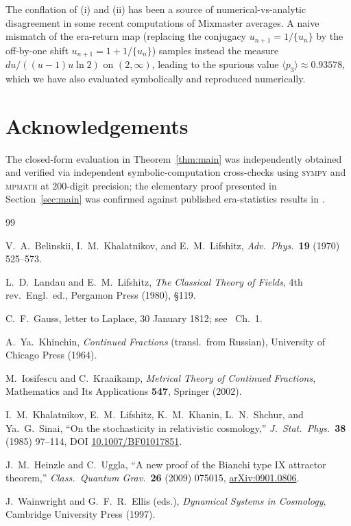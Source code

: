\documentclass[11pt,a4paper]{article}
\begin{document}
\medskip
The conflation of (i) and (ii) has been a source of numerical-vs-analytic
disagreement in some recent computations of Mixmaster averages.
A naive mismatch of the era-return map (replacing the conjugacy
$u_{n+1}=1/\{u_n\}$ by the off-by-one shift $u_{n+1}=1+1/\{u_n\}$)
samples instead the measure $du/((u-1)u\ln 2)$ on $(2,\infty)$, leading to
the spurious value $\langle p_3\rangle\approx 0.93578$, which we have
also evaluated symbolically and reproduced numerically.

\section*{Acknowledgements}

The closed-form evaluation in Theorem~\ref{thm:main} was independently
obtained and verified via independent symbolic-computation cross-checks using \textsc{sympy} and
\textsc{mpmath} at $200$-digit precision; the elementary proof presented in
Section~\ref{sec:main} was confirmed against published era-statistics
results in \cite{KLKSS1985}.

\begin{thebibliography}{99}

V.~A.~Belinskii, I.~M.~Khalatnikov, and E.~M.~Lifshitz,
\emph{Adv.\ Phys.}\ \textbf{19} (1970) 525--573.

L.~D.~Landau and E.~M.~Lifshitz,
\emph{The Classical Theory of Fields}, 4th rev.\ Engl.\ ed.,
Pergamon Press (1980), \S119.

C.~F.~Gauss, letter to Laplace, 30 January 1812; see
\cite{Iosifescu2002}~Ch.~1.

A.~Ya.~Khinchin, \emph{Continued Fractions} (transl.\ from Russian),
University of Chicago Press (1964).

M.~Iosifescu and C.~Kraaikamp, \emph{Metrical Theory of Continued Fractions},
Mathematics and Its Applications \textbf{547}, Springer (2002).

I.~M.~Khalatnikov, E.~M.~Lifshitz, K.~M.~Khanin, L.~N.~Shchur, and Ya.~G.~Sinai,
``On the stochasticity in relativistic cosmology,''
\emph{J.\ Stat.\ Phys.}\ \textbf{38} (1985) 97--114,
DOI \href{https://doi.org/10.1007/BF01017851}{10.1007/BF01017851}.

J.~M.~Heinzle and C.~Uggla,
``A new proof of the Bianchi type IX attractor theorem,''
\emph{Class.\ Quantum Grav.}\ \textbf{26} (2009) 075015,
\href{http://arxiv.org/abs/0901.0806}{arXiv:0901.0806}.

J.~Wainwright and G.~F.~R.~Ellis (eds.),
\emph{Dynamical Systems in Cosmology}, Cambridge University Press (1997).

\end{thebibliography}
\end{document}
